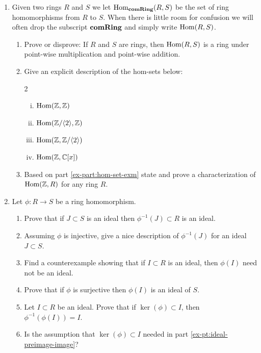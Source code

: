 \documentclass[12pt,reqno]{amsart}
\begin{document}
\begin{enumerate}[leftmargin=*]
\item Given two rings $R$ and $S$ we let $\operatorname{Hom}_{\operatorname{\textbf{comRing}}}(R,S)$ be the set of ring homomorphisms from $R$ to $S$. When there is little room for confusion we will often drop the subscript $\operatorname{\textbf{comRing}}$ and simply write $\operatorname{Hom}(R,S)$. 
	\begin{enumerate}[label=(\alph*),ref=\theenumi\alph*]
		\item Prove or disprove: If $R$ and $S$ are rings, then $\operatorname{Hom}(R,S)$ is a ring under point-wise multiplication and point-wise addition. 
		\item\label{ex-part:hom-set-exm} Give an explicit description of the hom-sets below:
		\begin{multicols}{2}
		\begin{enumerate}[(i)]
			\item $\operatorname{Hom}(\mathbb{Z}, \mathbb{Z})$
			\item $\operatorname{Hom}(\mathbb{Z}/\langle 2 \rangle, \mathbb{Z})$
			\item $\operatorname{Hom}(\mathbb{Z}, \mathbb{Z}/\langle 2 \rangle)$
			\item $\operatorname{Hom}(\mathbb{Z}, \mathbb{C}[x])$
		\end{enumerate}
		\end{multicols}
		\item Based on part \ref{ex-part:hom-set-exm} state and prove a characterization of $\operatorname{Hom}(\mathbb{Z},R)$ for any ring $R$. 
	\end{enumerate}
		
	\item Let $\phi:R \to S$ be a ring homomorphism.
	\begin{enumerate}[label=(\alph*),ref=\theenumi\alph*]
		\item Prove that if $J \subset S$ is an ideal then $\phi^{-1}(J) \subset R$ is an ideal.
		\item Assuming $\phi$ is injective, give a nice description of $\phi^{-1}(J)$ for an ideal $J \subset S$. 
		\item Find a counterexample showing that if $I \subset R$ is an ideal, then $\phi(I)$ need not be an ideal.
		\item Prove that if $\phi$ is surjective then $\phi(I)$ is an ideal of $S$. 
		\item\label{ex-pt:ideal-preimage-image} Let $I \subset R$ be an ideal. Prove that if $\ker(\phi) \subset I$, then $\phi^{-1}(\phi(I))=I$.
		\item Is the assumption that $\ker(\phi) \subset I$ needed in part \ref{ex-pt:ideal-preimage-image}?
	\end{enumerate}
	
\end{enumerate}
\end{document}
